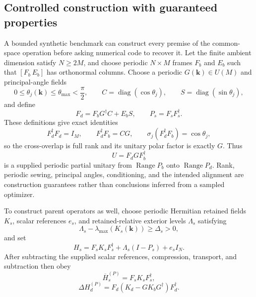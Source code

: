 \documentclass[11pt]{article}
\newenvironment{prospective}{\color{prospectivered}}{}
\begin{document}
\begin{prospective}
\subsection{Controlled construction with guaranteed properties}
A bounded synthetic benchmark can construct every premise of the common-space operation
before asking numerical code to recover it. Let the finite ambient dimension satisfy
$N\geq2M$, and choose periodic $N\times M$ frames $F_b$ and $E_b$ such that
$[F_b\ E_b]$ has orthonormal columns. Choose a periodic $G(\mathbf k)\in U(M)$ and
principal-angle fields
\begin{equation}
 0\leq\theta_j(\mathbf k)\leq\theta_{\max}<\frac{\pi}{2},
 \qquad
 C=\operatorname{diag}(\cos\theta_j),
 \qquad
 S=\operatorname{diag}(\sin\theta_j),
\end{equation}
and define
\begin{equation}
 F_d=F_bG^\dagger C+E_bS,
 \qquad
 P_s=F_sF_s^\dagger.
 \label{eq:constructed-defect-frame}
\end{equation}
These definitions give exact identities
\begin{equation}
 F_d^\dagger F_d=I_M,
 \qquad
 F_d^\dagger F_b=CG,
 \qquad
 \sigma_j(F_d^\dagger F_b)=\cos\theta_j,
 \label{eq:constructed-overlap}
\end{equation}
so the cross-overlap is full rank and its unitary polar factor is exactly $G$. Thus
\begin{equation}
 U=F_dGF_b^\dagger
 \label{eq:constructed-alignment}
\end{equation}
is a supplied periodic partial unitary from $\operatorname{Range}P_b$ onto
$\operatorname{Range}P_d$. Rank, periodic sewing, principal angles, conditioning, and
the intended alignment are construction guarantees rather than conclusions inferred
from a sampled optimizer.

To construct parent operators as well, choose periodic Hermitian retained fields $K_s$,
scalar references $e_s$, and retained-relative exterior levels $\Lambda_s$ satisfying
\begin{equation}
 \Lambda_s-\lambda_{\max}(K_s(\mathbf k))\geq\Delta_s>0,
\end{equation}
and set
\begin{equation}
 H_s=F_sK_sF_s^\dagger+\Lambda_s(I-P_s)+e_sI_N.
 \label{eq:constructed-parent-pair}
\end{equation}
After subtracting the supplied scalar references, compression, transport, and subtraction
then obey
\begin{equation}
 \overline H_s^{(P)}=F_sK_sF_s^\dagger,
\end{equation}
\begin{equation}
 \Delta H_d^{(P)}
 =F_d\left(K_d-GK_bG^\dagger\right)F_d^\dagger.
 \label{eq:constructed-defect-difference}
\end{equation}


\end{prospective}
\end{document}
